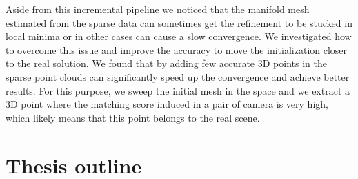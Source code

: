 Aside from this incremental pipeline we noticed that the manifold mesh estimated from the sparse data can sometimes get the refinement to be stucked  in local minima or in other cases can cause a slow convergence. 
We investigated how to overcome this issue and improve the accuracy to move the initialization closer to the real solution.
We found that by adding few accurate 3D points in the sparse point clouds can significantly speed up the convergence and achieve better results.
For this purpose, we sweep the initial mesh in the space and we extract a 3D point where the matching score induced in a pair of camera is very high, which likely means that this point belongs to the real scene.





\section{Thesis outline}










